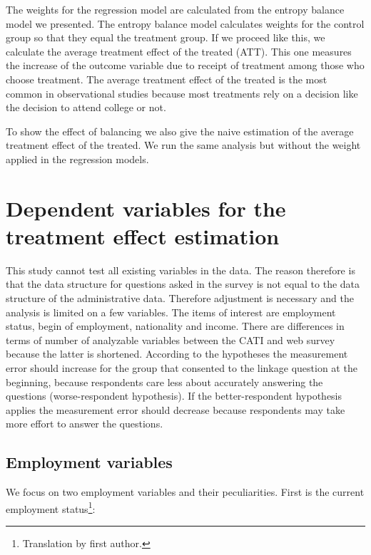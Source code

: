 The weights for the regression model are calculated from the entropy balance model we presented. The entropy balance model calculates weights for the control group so that they equal the treatment group. If we proceed like this, we calculate the average treatment effect of the treated (ATT). This one measures the increase of the outcome variable due to receipt of treatment among those who choose treatment. The average treatment effect of the treated is the most common in observational studies because most treatments rely on a decision like the decision to attend college or not.

To show the effect of balancing we also give the naive estimation of the average treatment effect of the treated. We run the same analysis but without the weight applied in the regression models.

\section{Dependent variables for the treatment effect estimation}\label{variables}

This study cannot test all existing variables in the data. The reason therefore is that the data structure for questions asked in the survey is not equal to the data structure of the administrative data. Therefore adjustment is necessary and the analysis is limited on a few variables. The items of interest are employment status, begin of employment, nationality and income. There are differences in terms of number of analyzable variables between the CATI and web survey because the latter is shortened. According to the hypotheses the measurement error should increase for the group that consented to the linkage question at the beginning, because respondents care less about accurately answering the questions (worse-respondent hypothesis). If the better-respondent hypothesis applies the measurement error should decrease because respondents may take more effort to answer the questions.

\subsection{Employment variables}

We focus on two employment variables and their peculiarities. First is the current employment status\footnote{Translation by first author.}:

